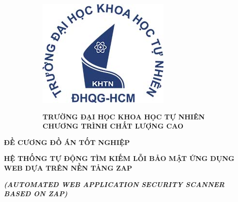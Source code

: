 \begin{titlepage}
    \centering
    \begin{figure}
        \begin{subfigure}[c][][t]{0.2\textwidth}
            \includegraphics[width=\textwidth]{images/logo.jpg}
        \end{subfigure}
        \hspace{40pt}
        \begin{subfigure}[c][][t]{0.69\textwidth}
            \centering
            \textbf{TRƯỜNG ĐẠI HỌC KHOA HỌC TỰ NHIÊN\\
                    CHƯƠNG TRÌNH CHẤT LƯỢNG CAO}
        \end{subfigure}
    \end{figure}
    
    \vspace*{20pt}

    \textbf{\large ĐỀ CƯƠNG ĐỒ ÁN TỐT NGHIỆP}\\
    
    \vspace{10pt}
    
    \textbf{\LARGE HỆ THỐNG TỰ ĐỘNG TÌM KIẾM LỖI BẢO MẬT ỨNG DỤNG WEB DỰA TRÊN NỀN TẢNG ZAP }

    \vspace{10pt}

    \textbf{\textsl{\large (AUTOMATED WEB APPLICATION SECURITY SCANNER BASED ON ZAP)}}
\end{titlepage}